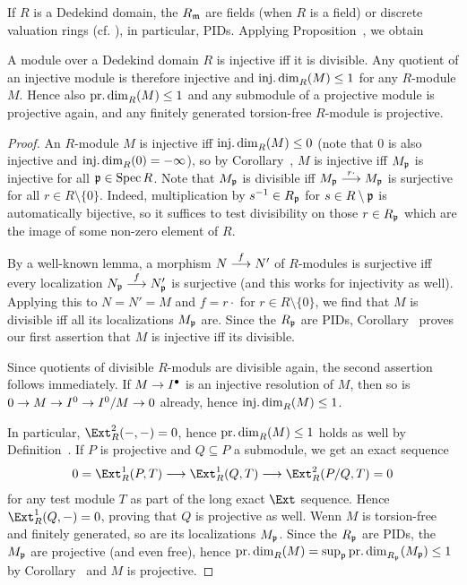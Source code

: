 \documentclass[a4paper,parskip=half,numbers=enddot, DIV=12]{scrreprt}
\begin{document}
If $R$ is a Dedekind domain, the $R_{\mathfrak{m}}$ are fields (when $R$ is a field) or discrete valuation rings (cf. \cite[Theorem~22]{alg2}), in particular, PIDs. Applying Proposition~, we obtain
\begin{cor}
	A module over a Dedekind domain $R$ is injective iff it is divisible. Any quotient of an injective module is therefore injective and $\operatorname{inj.dim}_R(M)\leq 1$ for any $R$-module $M$. Hence also $\operatorname{pr.dim}_R(M)\leq 1$ and any submodule of a projective module is projective again, and any finitely generated torsion-free $R$-module is projective.
\end{cor}
\begin{proof}
	An $R$-module $M$ is injective iff $\operatorname{inj.dim}_R(M)\leq 0$ (note that $0$ is also injective and $\operatorname{inj.dim}_R(0)=-\infty$), so by Corollary~, $M$ is injective iff $M_{\mathfrak{p}}$ is injective for all $\mathfrak{p}\in \operatorname{Spec} R$. Note that $M_{\mathfrak{p}}$ is divisible iff $M_\pp\morphism[r\cdot]M_\pp$ is surjective for all $r\in R\setminus\{0\}$. Indeed, multiplication by $s^{-1}\in R_{\mathfrak{p}}$ for $s\in R\setminus \mathfrak{p}$ is automatically bijective, so it suffices to test divisibility on those $r\in R_{\mathfrak{p}}$ which are the image of some non-zero element of $R$.
	
	By a well-known lemma, a morphism $N\morphism[f]N'$ of $R$-modules is surjective iff every localization $N_\pp\morphism[f]N'_\pp$ is surjective (and this works for injectivity as well). Applying this to $N=N'=M$ and $f=r\cdot$ for $r\in R\setminus\{0\}$, we find that $M$ is divisible iff all its localizations $M_{\mathfrak{p}}$ are. Since the $R_{\mathfrak{p}}$ are PIDs, Corollary~ proves our first assertion that $M$ is injective iff its divisible.
	
	Since quotients of divisible $R$-moduls are divisible again, the second assertion follows immediately. If $M\morphism I^\bullet$ is an injective resolution of $M$, then so is $0\morphism M\morphism I^0\morphism I^0/M\morphism 0$ already, hence $\operatorname{inj.dim}_R(M)\leq 1$.
	
	In particular, $\Ext_R^2(-,-)=0$, hence $\operatorname{pr.dim}_R(M)\leq 1$ holds as well by Definition~. If $P$ is projective and $Q\subseteq P$ a submodule, we get an exact sequence 
	\begin{align*}
		0=\Ext_R^1(P,T)\morphism\Ext_R^1(Q,T)\morphism\Ext_R^2(P/Q,T)=0
	\end{align*}
	for any test module $T$ as part of the long exact $\Ext$ sequence. Hence $\Ext_R^1(Q,-)=0$, proving that $Q$ is projective as well. Wenn $M$ is torsion-free and finitely generated, so are its localizations $M_{\mathfrak{p}}$. Since the $R_{\mathfrak{p}}$ are PIDs, the $M_{\mathfrak{p}}$ are projective (and even free), hence $\operatorname{pr.dim}_R(M)=\sup_{\mathfrak{p}}\operatorname{pr.dim}_{R_{\mathfrak{p}}}(M_{\mathfrak{p}})\leq 1$ by Corollary~ and $M$ is projective.
\end{proof}
\end{document}
